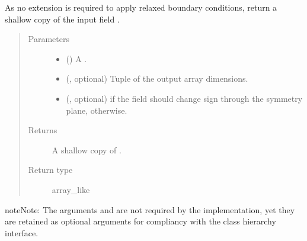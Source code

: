 \documentclass[letterpaper,10pt,english]{sphinxmanual}
\begin{document}
\begin{fulllineitems}
\begin{fulllineitems}
\label{\detokenize{api:dycore.horizontal_boundary_relaxed.Relaxed.from_computational_to_physical_domain}}
As no extension is required to apply relaxed boundary conditions, return a shallow copy of the
input field .
\begin{quote}\begin{description}
\item[{Parameters}] \leavevmode\begin{itemize}
\item {} 
 () \textendash{} A .

\item {} 
 (, optional) \textendash{} Tuple of the output array dimensions.

\item {} 
 (, optional) \textendash{}  if the field should change sign through the symmetry plane,  otherwise.

\end{itemize}

\item[{Returns}] \leavevmode
A shallow copy of .

\item[{Return type}] \leavevmode
array\_like

\end{description}\end{quote}

\begin{sphinxadmonition}{note}{Note:}
The arguments  and  are not required by the implementation,
yet they are retained as optional arguments for compliancy with the class hierarchy interface.
\end{sphinxadmonition}

\end{fulllineitems}



\end{fulllineitems}
\end{document}
